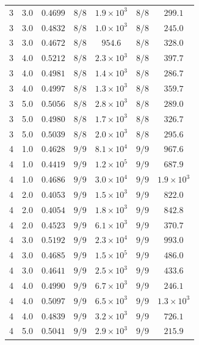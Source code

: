 \begin{tabular}{cc c cc cc}
        3 & 3.0 & $0.4699$ & $8/8$ & $1.9 \times 10^{3}$ & $8/8$ & $299.1$ \\
        3 & 3.0 & $0.4832$ & $8/8$ & $1.0 \times 10^{3}$ & $8/8$ & $245.0$ \\
        3 & 3.0 & $0.4672$ & $8/8$ & $954.6$ & $8/8$ & $328.0$ \\
        3 & 4.0 & $0.5212$ & $8/8$ & $2.3 \times 10^{3}$ & $8/8$ & $397.7$ \\
        3 & 4.0 & $0.4981$ & $8/8$ & $1.4 \times 10^{3}$ & $8/8$ & $286.7$ \\
        3 & 4.0 & $0.4997$ & $8/8$ & $1.3 \times 10^{3}$ & $8/8$ & $359.7$ \\
        3 & 5.0 & $0.5056$ & $8/8$ & $2.8 \times 10^{3}$ & $8/8$ & $289.0$ \\
        3 & 5.0 & $0.4980$ & $8/8$ & $1.7 \times 10^{3}$ & $8/8$ & $326.7$ \\
        3 & 5.0 & $0.5039$ & $8/8$ & $2.0 \times 10^{3}$ & $8/8$ & $295.6$ \\
        4 & 1.0 & $0.4628$ & $9/9$ & $8.1 \times 10^{4}$ & $9/9$ & $967.6$ \\
        4 & 1.0 & $0.4419$ & $9/9$ & $1.2 \times 10^{5}$ & $9/9$ & $687.9$ \\
        4 & 1.0 & $0.4686$ & $9/9$ & $3.0 \times 10^{4}$ & $9/9$ & $1.9 \times 10^{3}$ \\
        4 & 2.0 & $0.4053$ & $9/9$ & $1.5 \times 10^{3}$ & $9/9$ & $822.0$ \\
        4 & 2.0 & $0.4054$ & $9/9$ & $1.8 \times 10^{3}$ & $9/9$ & $842.8$ \\
        4 & 2.0 & $0.4523$ & $9/9$ & $6.1 \times 10^{3}$ & $9/9$ & $370.7$ \\
        4 & 3.0 & $0.5192$ & $9/9$ & $2.3 \times 10^{4}$ & $9/9$ & $993.0$ \\
        4 & 3.0 & $0.4685$ & $9/9$ & $1.5 \times 10^{5}$ & $9/9$ & $486.0$ \\
        4 & 3.0 & $0.4641$ & $9/9$ & $2.5 \times 10^{3}$ & $9/9$ & $433.6$ \\
        4 & 4.0 & $0.4990$ & $9/9$ & $6.7 \times 10^{3}$ & $9/9$ & $246.1$ \\
        4 & 4.0 & $0.5097$ & $9/9$ & $6.5 \times 10^{3}$ & $9/9$ & $1.3 \times 10^{3}$ \\
        4 & 4.0 & $0.4839$ & $9/9$ & $3.2 \times 10^{3}$ & $9/9$ & $726.1$ \\
        4 & 5.0 & $0.5041$ & $9/9$ & $2.9 \times 10^{3}$ & $9/9$ & $215.9$ \\

\end{tabular}
